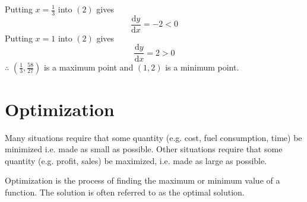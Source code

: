 \documentclass[11pt,a4paper]{book}
\begin{document}
\begin{example}
\begin{enumerate}[label=(\alph*)]
Putting ${\displaystyle x=\frac{1}{3}}$ into $\left(2\right)$ gives
\[
\frac{\mathrm{d}y}{\mathrm{d}x}=-2<0
\]
Putting $x=1$ into $\left(2\right)$ gives
\[
\frac{\mathrm{d}y}{\mathrm{d}x}=2>0
\]
$\therefore$ ${\displaystyle \left(\frac{1}{3},\frac{58}{27}\right)}$
is a maximum point and $\left(1,2\right)$ is a minimum point.

\end{enumerate}

\end{example}

\newpage{}

\section{Optimization}

Many situations require that some quantity (e.g. cost, fuel consumption, time) be minimized i.e. made as small as possible. Other situations require that some quantity (e.g. profit, sales) be maximized, i.e. made as large as possible.

Optimization is the process of finding the maximum or minimum value
of a function. The solution is often referred to as the optimal solution.
\end{document}
